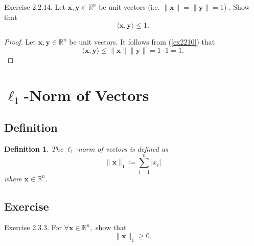 \documentclass{article}
\theoremstyle{plain}
\newtheorem{dfn}{Definition}[subsection]
\begin{document}
\begin{itembox}[l]{Exercise 2.2.14.}
  Let
  \begin{math}
    \bm{x} , \bm{y} \in \mathbb{R}^n
  \end{math}
  be unit vectors (i.e. $\lVert \bm{x} \rVert = \lVert \bm{y} \rVert = 1$) . Show that
  \begin{equation}
    \label{ex2214}
    \langle \bm{x} , \bm{y} \rangle \leq 1 .
  \end{equation}
\end{itembox}

\begin{proof}
  Let
  \begin{math}
    \bm{x} , \bm{y} \in \mathbb{R}^n
  \end{math}
  be unit vectors. It follows from (\ref{ex2210}) that
  \begin{equation*}
    \langle \bm{x} , \bm{y} \rangle \leq \lVert \bm{x} \rVert \lVert \bm{y} \rVert = 1 \cdot 1 = 1 .
  \end{equation*}
\end{proof}

\section{$\ell_1$-Norm of Vectors}

\subsection{Definition}

\begin{dfn}
  The $\ell_1$-norm of vectors is defined as
  \begin{equation}
    \label{def_l_1}
    \lVert \bm{x} \rVert_1 \coloneq \sum_{i=1}^n |x_i|
  \end{equation}
  where
  \begin{math}
    \bm{x} \in \mathbb{R}^n.
  \end{math}
\end{dfn}

\subsection{Exercise}

\begin{itembox}[l]{Exercise 2.3.3.}
  For
  \begin{math}
    \forall \bm{x} \in \mathbb{R}^n ,
  \end{math}
  show that
  \begin{equation}
    \label{ex233}
    \lVert \bm{x} \rVert_1 \geq 0 .
  \end{equation}
\end{itembox}
\end{document}
